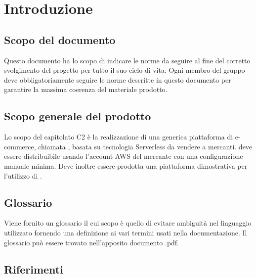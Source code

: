 
\section{Introduzione}
\subsection{Scopo del documento}
Questo documento ha lo scopo di indicare le norme da seguire al fine del corretto svolgimento del progetto per tutto il suo ciclo di vita. 
Ogni membro del gruppo \Omicron{} deve obbligatoriamente seguire le norme descritte in questo documento per garantire la massima coerenza del materiale prodotto.

\subsection{Scopo generale del prodotto}
Lo scopo del capitolato C2 è la realizzazione di una generica piattaforma di e-commerce, chiamata \nameproject{}, basata su tecnologia Serverless da vendere a mercanti. \nameproject{} deve essere distribuibile usando l'account AWS del mercante con una configurazione manuale minima. Deve inoltre essere prodotta una piattaforma dimostrativa per l'utilizzo di \nameproject{}.   

\subsection{Glossario}
Viene fornito un glossario il cui scopo è quello di evitare ambiguità nel linguaggio utilizzato fornendo una definizione ai vari termini usati nella documentazione. Il glossario può essere trovato nell'apposito documento \Glossario{}.pdf.

\subsection{Riferimenti}
